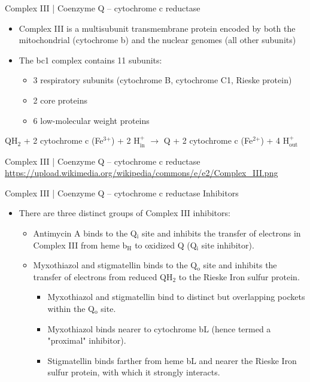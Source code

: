 \documentclass[presentation, smaller]{beamer}
\begin{document}
\begin{frame}[label={sec:orga5979ad}]{Complex III | Coenzyme Q – cytochrome c reductase}
\begin{itemize}
\item Complex III is a multisubunit transmembrane protein encoded by both
the mitochondrial (cytochrome b) and the nuclear genomes (all other
subunits)

\item The bc1 complex contains 11 subunits:
\begin{itemize}
\item 3 respiratory subunits (cytochrome B, cytochrome C1, Rieske protein)
\item 2 core proteins
\item 6 low-molecular weight proteins
\end{itemize}
\end{itemize}

QH\(_{\text{2}}\) + 2 cytochrome c (Fe\(^{\text{3+}}\)) + 2 H\(^{\text{+}}_{\text{in}}\) \(\to\)  Q + 2 cytochrome c (Fe\(^{\text{2+}}\)) + 4 H\(^{\text{+}}_{\text{out}}\)
\end{frame}


\begin{frame}[label={sec:org7ac3abd}]{Complex III | Coenzyme Q – cytochrome c reductase}
\url{https://upload.wikimedia.org/wikipedia/commons/e/e2/Complex\_III.png}
\end{frame}

\begin{frame}[label={sec:org3d281d8}]{Complex III | Coenzyme Q – cytochrome c reductase Inhibitors}
\begin{itemize}
\item There are three distinct groups of Complex III inhibitors:
\begin{itemize}
\item Antimycin A binds to the Q\(_{\text{i}}\) site and inhibits the transfer of electrons in Complex III from heme b\(_{\text{H}}\) to oxidized Q (Q\(_{\text{i}}\) site inhibitor).
\item Myxothiazol and stigmatellin binds to the Q\(_{\text{o}}\) site and inhibits the transfer of electrons from reduced QH\(_{\text{2}}\) to the Rieske Iron sulfur protein.
\begin{itemize}
\item Myxothiazol and stigmatellin bind to distinct but overlapping pockets within the Q\(_{\text{o}}\) site.
\item Myxothiazol binds nearer to cytochrome bL (hence termed a "proximal" inhibitor).
\item Stigmatellin binds farther from heme bL and nearer the Rieske Iron sulfur protein, with which it strongly interacts.
\end{itemize}
\end{itemize}
\end{itemize}
\end{frame}
\end{document}
